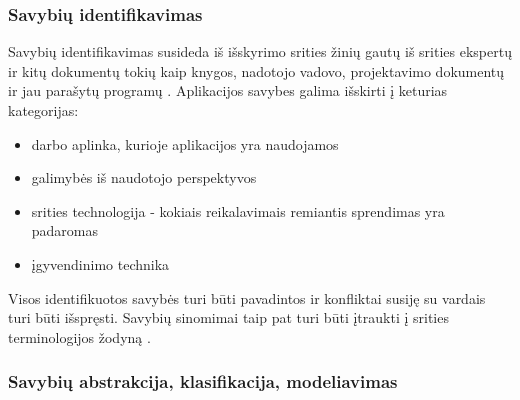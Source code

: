 \documentclass{VUMIFPSkursinis}
\begin{document}
\subsubsection{Savybių identifikavimas} \label{identifikavimas}

Savybių identifikavimas susideda iš išskyrimo srities žinių gautų iš srities ekspertų ir kitų dokumentų tokių kaip knygos, nadotojo vadovo, projektavimo dokumentų ir jau parašytų programų \cite{Lee2015}. Aplikacijos savybes galima išskirti į keturias kategorijas:
\begin{itemize}
\item darbo aplinka, kurioje aplikacijos yra naudojamos
\item galimybės iš naudotojo perspektyvos 
\item srities technologija - kokiais reikalavimais remiantis sprendimas yra padaromas 
\item įgyvendinimo technika
\end{itemize}




Visos identifikuotos savybės turi būti pavadintos ir konfliktai susiję su vardais turi būti išspręsti. Savybių sinomimai taip pat turi būti įtraukti į srities terminologijos žodyną \cite{Kang1990}.

\subsubsection{Savybių abstrakcija, klasifikacija, modeliavimas}
\end{document}
